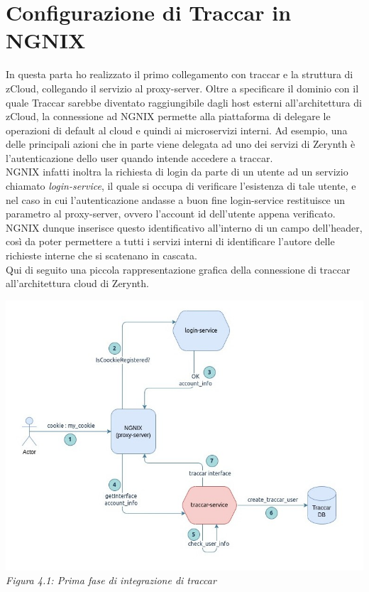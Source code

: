 \documentclass[a4paper,titlepage,12pt]{book}
\begin{document}
\section{\sffamily
Configurazione di Traccar in NGNIX}
In questa parta ho realizzato il primo collegamento con traccar e la struttura di zCloud, collegando il servizio al proxy-server. Oltre a specificare il dominio con il quale Traccar sarebbe diventato raggiungibile dagli host esterni all'architettura di zCloud, la connessione ad NGNIX permette alla piattaforma di delegare le operazioni di default al cloud e quindi ai microservizi interni. Ad esempio, una delle principali azioni che in parte viene delegata ad uno dei servizi di Zerynth è l'autenticazione dello user quando intende accedere a traccar. \\
NGNIX infatti inoltra la richiesta di login da parte di un utente ad un servizio chiamato \textit{login-service}, il quale si occupa di verificare l'esistenza di tale utente, e nel caso in cui l'autenticazione andasse a buon fine login-service restituisce un parametro al proxy-server, ovvero l'account id dell'utente appena verificato. NGNIX dunque inserisce questo identificativo all'interno di un campo dell'header, così da poter permettere a tutti i servizi interni di identificare l'autore delle richieste interne che si scatenano in cascata.\\
Qui di seguito una piccola rappresentazione grafica della connessione di traccar all'architettura cloud di Zerynth.\\

\begin{center}
\centering
\includegraphics[scale=0.6]{images/traccar_login_serv.jpg}\\ 
\textit{Figura 4.1: Prima fase di integrazione di traccar}\label{fig:}

\end{center}
\end{document}
